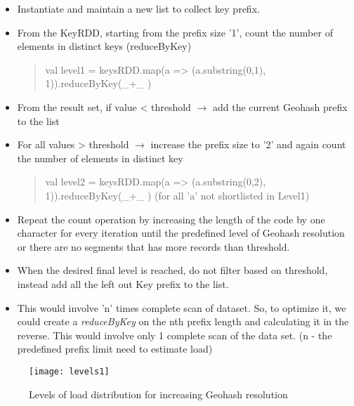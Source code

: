 \documentclass[article,type=msc,colorback,10pt,accentcolor=tud1d]{tudthesis}
\begin{document}
				\begin{itemize}
					\item Instantiate and maintain a new list to collect key prefix.
					
					\item From the KeyRDD, starting from the prefix size '1', count the number of elements in distinct keys (reduceByKey)
						\begin{quote} val level1 = keysRDD.map(a => (a.substring(0,1), 1)).reduceByKey(\_+\_ )
						\end{quote}
						
					\item From the result set, if value < threshold $\to$ add the current Geohash prefix to the list 
					
					\item For all values > threshold $\to$ increase the prefix size to '2' and again count the number of elements in distinct key
						\begin{quote} val level2 = keysRDD.map(a => (a.substring(0,2), 1)).reduceByKey(\_+\_ ) 
							 (for all 'a' not shortlisted in Level1)
							 
						\end{quote}
				 
					\item Repeat the count operation by increasing the length of the code by one character for every iteration until the predefined level of Geohash resolution or there are no segments that has more records than threshold. 
					\item When the desired final level is reached, do not filter based on threshold, instead add all the left out Key prefix to the list.
					\item This would involve 'n' times complete scan of dataset. So, to optimize it, we could create a \textit{reduceByKey} on the nth prefix length and calculating it in the reverse. This would involve only 1 complete scan of the data set. (n - the predefined prefix limit need to estimate load)
			 	
				\end{itemize}
															
				\begin{figure}[h]
					\centering
					\texttt{[image: levels1]}
					\caption{Levels of load distribution for increasing Geohash resolution}
					\label{fig:loadlevels}
				\end{figure}
			
			\clearpage						
				
\end{document}
